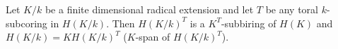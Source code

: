 Let $K/k$ be a finite dimensional radical extension and let $T$ be any toral $k$-subcoring in $H(K/k)$. Then $H(K/k)^T$ is a $K^T$-subbiring of $H(K)$ and $H(K/k) = K H(K/k)^T$ ($K$-span of $H(K/k)^T$).
